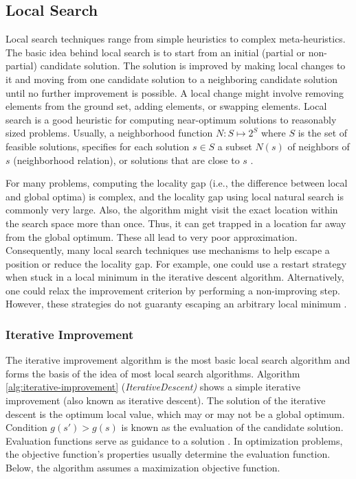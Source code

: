 \subsection{Local Search}
Local search techniques range from simple heuristics to complex meta-heuristics. The basic idea behind local search is to start from an initial (partial or non-partial) \gls{candidate solution}. The solution is improved by making local changes to it and moving from one \gls{candidate solution} to a neighboring \gls{candidate solution} until no further improvement is possible. A local change might involve removing elements from the ground set, adding elements, or swapping elements. Local search is a good heuristic for computing near-optimum solutions to reasonably sized problems. Usually, a neighborhood function $N: S \mapsto 2^S$ where $S $ is the set of feasible solutions, specifies for each solution $s \in S$ a subset $N(s)$ of neighbors of $s$ (neighborhood relation), or solutions that are close to $s$ \parencite{Gonzalez2007HandbookMetaheuristics}.

For many problems, computing the locality gap (i.e., the difference between local and global optima) is complex, and the locality gap using local natural search is commonly very large. Also, the algorithm might visit the exact location within the search space more than once. Thus, it can get trapped in a location far away from the global optimum. These all lead to very poor approximation. Consequently, many local search techniques use mechanisms to help escape a position or reduce the locality gap. For example, one could use a restart strategy when stuck in a local minimum in the iterative descent algorithm. Alternatively, one could relax the improvement criterion by performing a non-improving step. However, these strategies do not guaranty escaping an arbitrary local minimum \parencite{HolgerH2005StochasticSearch}.


\subsubsection{Iterative Improvement}
The iterative improvement algorithm is the most basic local search algorithm and forms the basis of the idea of most local search algorithms. Algorithm \ref{alg:iterative-improvement} (\textit{IterativeDescent)} shows a simple iterative improvement (also known as iterative descent). The solution of the iterative descent is the optimum local value, which may or may not be a global optimum. Condition $g(s') > g(s)$ is known as the evaluation of the candidate solution. Evaluation functions serve as guidance to a solution \parencite{HolgerH2005StochasticSearch}. In optimization problems, the objective function's properties usually determine the evaluation function. Below, the algorithm assumes a maximization objective function. 

